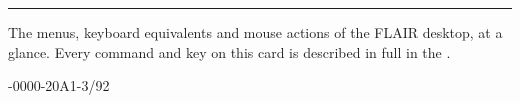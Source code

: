 \vspace{1pt}\noindent\rule{\linewidth}{0.5pt}\par\vspace{4mm}
\vspace{14mm}
\noindent\hspace*{-7mm}\colorbox{FamilySystems}{}\par
\vspace{20mm}
\noindent\begin{minipage}{\linewidth}\small
The menus, keyboard equivalents and mouse actions of the FLAIR desktop, at
a glance.  Every command and key on this card is described in full in the
.
\end{minipage}
\vfill
\noindent\Wordmark[24mm]\hfill{\sffamily\fontsize{6.5}{8}-0000-20\quad A1-3/92}\par
\newpage
